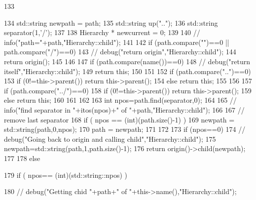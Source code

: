 \begin{DoxyCode}
133                                          {
134   std::string newpath = path;
135   std::string up("..");
136   std::string separator(1,'/');
137 
138   Hierarchy * newcurrent = 0;
139 
140   //  info("path="+path,"Hierarchy::child");
141 
142   if (path.compare("")==0 || path.compare("/")==0) {
143     //    debug("return origin","Hierarchy::child");
144     return origin();
145   }
146 
147   if (path.compare(name())==0){
148     //    debug("return itself","Hierarchy::child");
149     return this;
150   }
151 
152   if (path.compare("..")==0){
153     if (0!=this->parent()) return this->parent();
154     else return this;
155   }
156 
157   if (path.compare("../")==0){
158     if (0!=this->parent()) return this->parent();
159     else return this;
160   }
161 
162 
163   int npos=path.find(separator,0);
164 
165   //  info("find separator in "+itos(npos)+" of "+path,"Hierarchy::child");
166 
167   // remove last separator
168   if ( npos == (int)(path.size()-1) ) {
169     newpath = std::string(path,0,npos);
170     path = newpath;
171   }
172 
173   if (npos==0){
174     //    debug("Going back to origin and calling child","Hierarchy::child");
175     newpath=std::string(path,1,path.size()-1);
176     return origin()->child(newpath);
177   }
178   else{
179     if ( npos== (int)(std::string::npos) ){
180       //      debug("Getting chid "+path+" of "+this->name(),"Hierarchy::child");
      
}}}
\end{DoxyCode}
